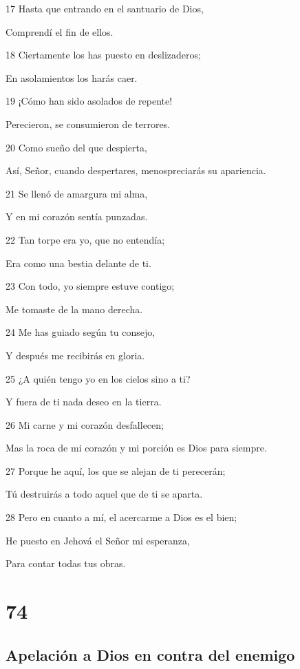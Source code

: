 \par 17 Hasta que entrando en el santuario de Dios,
\par Comprendí el fin de ellos.
\par 18 Ciertamente los has puesto en deslizaderos;
\par En asolamientos los harás caer.
\par 19 ¡Cómo han sido asolados de repente!
\par Perecieron, se consumieron de terrores.
\par 20 Como sueño del que despierta,
\par Así, Señor, cuando despertares, menospreciarás su apariencia.
\par 21 Se llenó de amargura mi alma,
\par Y en mi corazón sentía punzadas.
\par 22 Tan torpe era yo, que no entendía;
\par Era como una bestia delante de ti.
\par 23 Con todo, yo siempre estuve contigo;
\par Me tomaste de la mano derecha.
\par 24 Me has guiado según tu consejo,
\par Y después me recibirás en gloria.
\par 25 ¿A quién tengo yo en los cielos sino a ti?
\par Y fuera de ti nada deseo en la tierra.
\par 26 Mi carne y mi corazón desfallecen;
\par Mas la roca de mi corazón y mi porción es Dios para siempre.
\par 27 Porque he aquí, los que se alejan de ti perecerán;
\par Tú destruirás a todo aquel que de ti se aparta.
\par 28 Pero en cuanto a mí, el acercarme a Dios es el bien;
\par He puesto en Jehová el Señor mi esperanza,
\par Para contar todas tus obras.

\chapter{74}

\section*{Apelación a Dios en contra del enemigo}

